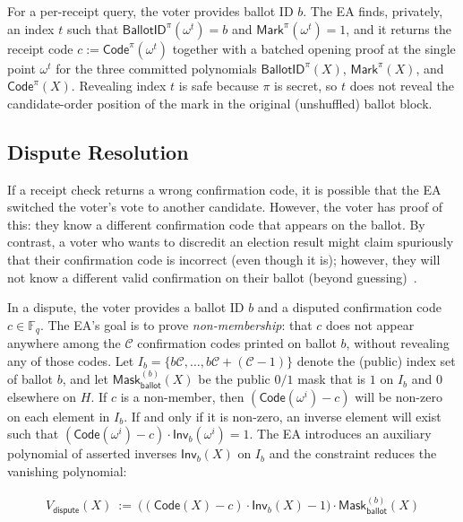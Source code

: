 For a per-receipt query, the voter provides ballot ID $b$. The EA finds, privately, an index $t$ such that $\mathsf{BallotID}^{\pi}(\omega^t)=b$ and $\mathsf{Mark}^{\pi}(\omega^t)=1$, and it returns the receipt code $c:=\mathsf{Code}^{\pi}(\omega^t)$ together with a batched opening proof at the single point $\omega^t$ for the three committed polynomials $\mathsf{BallotID}^{\pi}(X)$, $\mathsf{Mark}^{\pi}(X)$, and $\mathsf{Code}^{\pi}(X)$. Revealing index $t$ is safe because $\pi$ is secret, so $t$ does not reveal the candidate-order position of the mark in the original (unshuffled) ballot block.

\subsection{Dispute Resolution}
\label{sec:dispute}

If a receipt check returns a wrong confirmation code, it is possible that the EA switched the voter's vote to another candidate. However, the voter has proof of this: they know a different confirmation code that appears on the ballot. By contrast, a voter who wants to discredit an election result might claim spuriously that their confirmation code is incorrect (even though it is); however, they will not know a different valid confirmation on their ballot (beyond guessing)~\cite{CCC+08}.

In a dispute, the voter provides a ballot ID $b$ and a disputed confirmation code $c\in\mathbb{F}_q$. The EA’s goal is to prove \emph{non-membership}: that $c$ does not appear anywhere among the $\mathcal{C}$ confirmation codes printed on ballot $b$, without revealing any of those codes. Let $I_b=\{b\mathcal{C},\ldots,b\mathcal{C}+(\mathcal{C}-1)\}$ denote the (public) index set of ballot $b$, and let $\mathsf{Mask}^{(b)}_{\mathsf{ballot}}(X)$ be the public $0/1$ mask that is $1$ on $I_b$ and $0$ elsewhere on $H$. If $c$ is a non-member, then $(\mathsf{Code}(\omega^i)-c)$ will be non-zero on each element in $I_b$. If and only if it is non-zero, an inverse element will exist such that $(\mathsf{Code}(\omega^i)-c) \cdot \mathsf{Inv}_b(\omega^i)=1$. The EA introduces an auxiliary polynomial of asserted inverses $\mathsf{Inv}_b(X)$ on $I_b$ and the constraint reduces the vanishing polynomial:

\begin{mdframed}[linewidth=0.6pt,backgroundcolor=verylightpink,innerleftmargin=6pt,innerrightmargin=6pt,innertopmargin=4pt,innerbottommargin=4pt]
\[
\begin{aligned}
V_{\mathsf{dispute}}(X)\ :=\ \bigl((\mathsf{Code}(X)-c)\cdot \mathsf{Inv}_b(X)-1\bigr)\cdot \mathsf{Mask}^{(b)}_{\mathsf{ballot}}(X)
\end{aligned}
\]
\end{mdframed}

